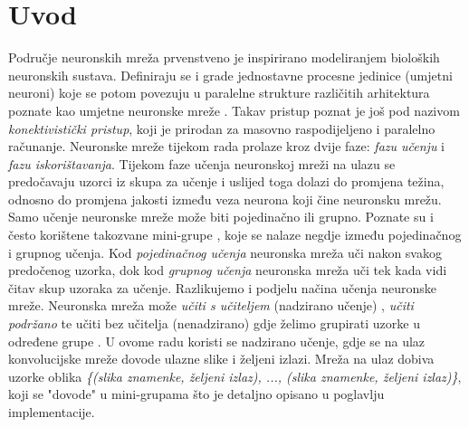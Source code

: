 \documentclass[times, utf8, diplomski]{fer}
\theoremstyle{definition}
\begin{document}
\section{Uvod}
Područje neuronskih mreža prvenstveno je inspirirano modeliranjem bioloških neuronskih sustava. Definiraju se i grade jednostavne procesne jedinice (umjetni neuroni) koje se potom povezuju u paralelne strukture različitih arhitektura poznate kao umjetne neuronske mreže . Takav pristup poznat je još pod nazivom \textit{konektivistički pristup}, koji je prirodan za masovno raspodijeljeno i paralelno računanje. Neuronske mreže tijekom rada prolaze kroz dvije faze: \textit{fazu učenju} i \textit{fazu iskorištavanja}. Tijekom faze učenja neuronskoj mreži na ulazu se predočavaju uzorci iz skupa za učenje i uslijed toga dolazi do promjena težina, odnosno do promjena jakosti između veza neurona koji čine neuronsku mrežu. Samo učenje neuronske mreže može biti pojedinačno ili grupno. Poznate su i često korištene takozvane mini-grupe , koje se nalaze negdje između pojedinačnog i grupnog učenja. Kod \textit{pojedinačnog učenja}  neuronska mreža uči nakon svakog predočenog uzorka, dok kod \textit{grupnog učenja}  neuronska mreža uči tek kada vidi čitav skup uzoraka za učenje. \newline
Razlikujemo i podjelu načina učenja neuronske mreže. Neuronska mreža može \textit{učiti s učiteljem} (nadzirano učenje) , \textit{učiti podržano}  te učiti bez učitelja (nenadzirano)  gdje želimo grupirati uzorke u određene grupe . U ovome radu koristi se nadzirano učenje, gdje se na ulaz konvolucijske mreže dovode ulazne slike i željeni izlazi. Mreža na ulaz dobiva uzorke oblika \textit{\{(slika znamenke, željeni izlaz), ..., (slika znamenke, željeni izlaz)\}}, koji se "dovode" u mini-grupama što je detaljno opisano u poglavlju implementacije.
\end{document}
